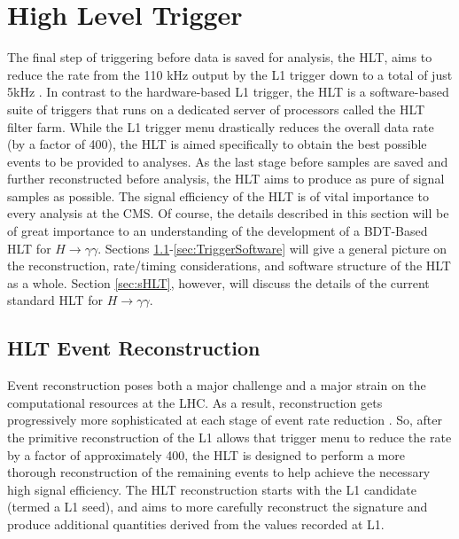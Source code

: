 \documentclass[12pt]{ucsddissertation}
\begin{document}
\section{High Level Trigger} \label{sec:HLT}
The final step of triggering before data is saved for analysis, the HLT, aims to reduce the rate from the 110 kHz output by the L1 trigger down to a total of just 5kHz \cite{Run2HLT2024}. In contrast to the hardware-based L1 trigger, the HLT is a software-based suite of triggers that runs on a dedicated server of processors called the HLT filter farm. While the L1 trigger menu drastically reduces the overall data rate (by a factor of 400), the HLT is aimed specifically to obtain the best possible events to be provided to analyses. As the last stage before samples are saved and further reconstructed before analysis, the HLT aims to produce as pure of signal samples as possible. The signal efficiency of the HLT is of vital importance to every analysis at the CMS. Of course, the details described in this section will be of great importance to an understanding of the development of a BDT-Based HLT for $H \rightarrow \gamma \gamma$. Sections \ref{sec:HLTReco}-\ref{sec:TriggerSoftware} will give a general picture on the reconstruction, rate/timing considerations, and software structure of the HLT as a whole. Section \ref{sec:sHLT}, however, will discuss the details of the current standard HLT for $H \rightarrow \gamma \gamma$. 
\subsection{HLT Event Reconstruction}\label{sec:HLTReco}
Event reconstruction poses both a major challenge and a major strain on the computational resources at the LHC. As a result, reconstruction gets progressively more sophisticated at each stage of event rate reduction \cite{OfflineReco2021}. So, after the primitive reconstruction of the L1 allows that trigger menu to reduce the rate by a factor of approximately 400, the HLT is designed to perform a more thorough reconstruction of the remaining events to help achieve the necessary high signal efficiency. The HLT reconstruction starts with the L1 candidate (termed a L1 seed), and aims to more carefully reconstruct the signature and produce additional quantities derived from the values recorded at L1. 
\end{document}
